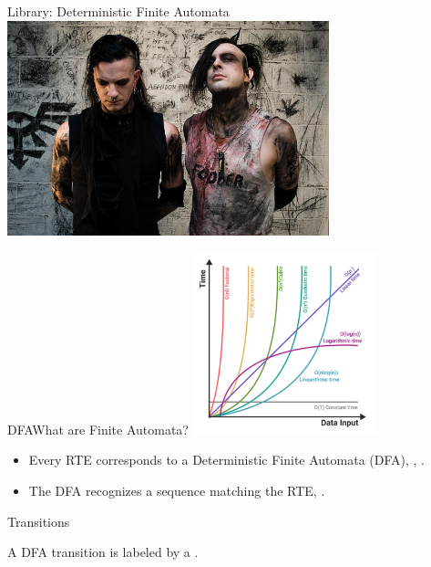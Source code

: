 


{  
\begin{frame}{Library: }{Deterministic Finite Automata}
  \centering
  \includegraphics[width=0.7\textwidth]{fa-band.jpg}
\end{frame}
}

\begin{frame}{DFA}{What are Finite Automata?}
  \includegraphics[width=0.4\textwidth]{complexity.png}

  \begin{itemize}
  \item   Every RTE corresponds to a Deterministic Finite Automata (DFA), , .

  \item   The DFA recognizes a sequence matching the RTE, .

  \end{itemize}
\end{frame}

\begin{frame}{ Transitions}

  \scalebox{0.8}{}

  A DFA transition is labeled by a .
\end{frame}




